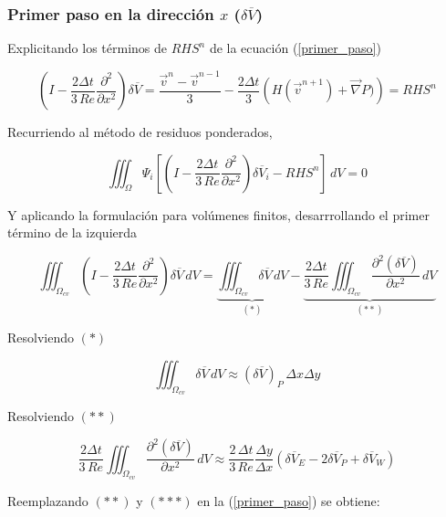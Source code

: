 \subsubsection{Primer paso en la dirección $x$ ($\delta \overline{V}$)} 

Explicitando los términos de $RHS^n$ de la ecuación (\ref{primer_paso})

\begin{equation}
\left( I - \dfrac{2 \Delta t}{3 \, Re} \dfrac{\partial^2}{\partial x^2} \right) \delta \overline{V} = \dfrac{\vec{v}^n-\vec{v}^{n-1}}{3} - \dfrac{2 \Delta t}{3} \left( H(\vec{v}^{n+1}) + \vec{\nabla} P) \right) = RHS^n
\end{equation}

Recurriendo al método de residuos ponderados,

\begin{equation} 
\iiint_{\Omega} \Psi_i \left[ \left( I - \dfrac{2 \Delta t}{3 \, Re}  \dfrac{\partial^2}{\partial x^2} \right) \delta \overline{V}_i - RHS^n \right] \, dV = 0
\end{equation}

Y aplicando la formulación para volúmenes finitos, desarrrollando el primer término de la izquierda

\begin{equation}
\iiint_{\Omega_{cv}} \left( I - \dfrac{2 \Delta t}{3 \, Re}  \dfrac{\partial^2}{\partial x^2} \right) \delta \overline{V} \, dV =  \underbrace{\iiint_{\Omega_{cv}} \delta \overline{V} \, dV}_{(*)}  - \underbrace{\dfrac{2 \Delta t}{3 \, Re} \iiint_{\Omega_{cv}}  \dfrac{\partial^2 (\delta \overline{V}) }{\partial x^2} \, dV}_{(**)}
\end{equation}

Resolviendo $(*)$

\begin{equation}
\iiint_{\Omega_{cv}} \delta \overline{V} \, dV \approx  (\delta \overline{V})_P \, \Delta x \Delta y
\end{equation}

Resolviendo $(**)$

\begin{equation}
\dfrac{2 \Delta t}{3 \, Re} \iiint_{\Omega_{cv}}  \dfrac{\partial^2 (\delta \overline{V}) }{\partial x^2} \, dV \approx \dfrac{2 \, \Delta t}{3 \, Re} \dfrac{\Delta y}{\Delta x} \left( \delta \overline{V}_E -2 \delta \overline{V}_P + \delta \overline{V}_W \right)
\end{equation}

Reemplazando $(**)$ y $(***)$ en la (\ref{primer_paso}) se obtiene:

